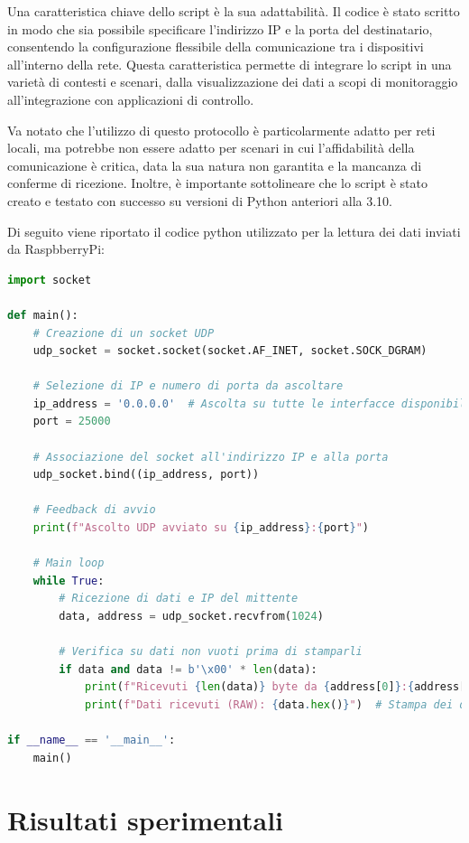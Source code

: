 \documentclass[titlepage]{report}
\begin{document}
	Una caratteristica chiave dello script è la sua adattabilità. Il codice è stato scritto in modo che sia possibile specificare l'indirizzo IP e la porta del destinatario, consentendo la configurazione flessibile della comunicazione tra i dispositivi all'interno della rete. Questa caratteristica permette di integrare lo script in una varietà di contesti e scenari, dalla visualizzazione dei dati a scopi di monitoraggio all'integrazione con applicazioni di controllo.

	Va notato che l'utilizzo di questo protocollo è particolarmente adatto per reti locali, ma potrebbe non essere adatto per scenari in cui l'affidabilità della comunicazione è critica, data la sua natura non garantita e la mancanza di conferme di ricezione. Inoltre, è importante sottolineare che lo script è stato creato e testato con successo su versioni di Python anteriori alla 3.10. \par

	Di seguito viene riportato il codice python utilizzato per la lettura dei dati inviati da RaspbberryPi:

	\begin{lstlisting}[label={lst:udp_listener.py},caption={Script \texttt{udp\_listener.py} per l'ascolto della porta UDP utilizzata dal RaspberryPi}, language=python]
import socket

def main():
	# Creazione di un socket UDP
	udp_socket = socket.socket(socket.AF_INET, socket.SOCK_DGRAM)

	# Selezione di IP e numero di porta da ascoltare
	ip_address = '0.0.0.0'  # Ascolta su tutte le interfacce disponibili
	port = 25000

	# Associazione del socket all'indirizzo IP e alla porta
	udp_socket.bind((ip_address, port))

	# Feedback di avvio
	print(f"Ascolto UDP avviato su {ip_address}:{port}")

	# Main loop
	while True:
		# Ricezione di dati e IP del mittente
		data, address = udp_socket.recvfrom(1024)

		# Verifica su dati non vuoti prima di stamparli
		if data and data != b'\x00' * len(data):
			print(f"Ricevuti {len(data)} byte da {address[0]}:{address[1]}")
			print(f"Dati ricevuti (RAW): {data.hex()}")  # Stampa dei dati in formato esadecimale (hex)

if __name__ == '__main__':
    main()
	\end{lstlisting}


\chapter*{Risultati sperimentali}
\label{ch:risultati_sperimentali}
\end{document}
